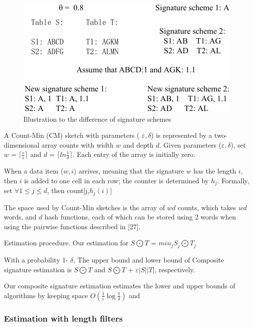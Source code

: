 \begin{figure}[h]
\centering
\includegraphics[scale=0.8]{figures/signature_example1}
 \caption{Illustration to the difference of signature schemes}
\label{fig:signature_example1}
\end{figure}

A Count-Min (CM) sketch with parameters ( $\varepsilon, \delta$) is represented by a two-dimensional
array counts with width $w$ and depth $d$. Given parameters ($\varepsilon, \delta$), set
$w$ = $\lceil \frac{e}{\varepsilon} \rceil$ and $d$ = $\lceil ln \frac{1}{\delta} \rceil $. Each entry of the array is initially zero.


When a data item ($w,i$) arrives, meaning that the signature $w$ has the length $i$, then $i$ is added to one cell in each row; the counter is determined by $h_j$. Formally, set $\forall 1 \leq j \leq d$, then count[j,$h_j(i)$]


The space used by Count-Min sketches is the array of $wd$ counts, which takes $wd$ words, and $d$ hash
functions, each of which can be stored using 2 words when using the pairwise functions described in [27].

Estimation procedure. Our estimation for $S \bigodot T $ = $min_j S_j \bigodot T_j $


\begin{theorem}
With a probability 1- $\delta$, The upper bound and lower bound of Composite signature estimation is
 $S \bigodot T $ and  $S \bigodot T $ + $\varepsilon |S| |T|$, respectively.
\end{theorem}

\begin{theorem}
Our composite signature estimation estimates the lower and upper bounds of algorithms by keeping space $O(\frac{1}{\varepsilon} \log \frac{1}{\delta})$ and
\end{theorem}

\subsubsection{Estimation with length filters}

